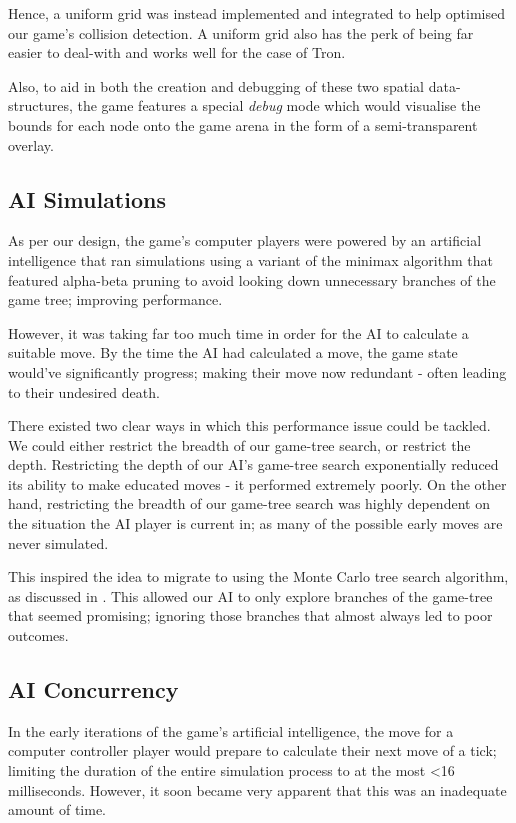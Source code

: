 \documentclass{standalone}
\begin{document}
			Hence, a uniform grid was instead implemented and integrated to help optimised our game's collision detection. A uniform grid also has the perk of being far easier to deal-with and works well for the case of Tron.

			Also, to aid in both the creation and debugging of these two spatial data-structures, the game features a special \emph{debug} mode which would visualise the bounds for each node onto the game arena in the form of a semi-transparent overlay.

		\subsection{AI Simulations} \label{sec:aiSimulations}
			As per our design, the game's computer players were powered by an artificial intelligence that ran simulations using a variant of the minimax algorithm \parencite{minimax} that featured alpha-beta pruning \parencite{alphaBeta} to avoid looking down unnecessary branches of the game tree; improving performance.

			However, it was taking far too much time in order for the AI to calculate a suitable move. By the time the AI had calculated a move, the game state would've significantly progress; making their move now redundant - often leading to their undesired death.

			There existed two clear ways in which this performance issue could be tackled. We could either restrict the breadth of our game-tree search, or restrict the depth. Restricting the depth of our AI's game-tree search exponentially reduced its ability to make educated moves - it performed extremely poorly. On the other hand, restricting the breadth of our game-tree search was highly dependent on the situation the AI player is current in; as many of the possible early moves are never simulated.

			This inspired the idea to migrate to using the Monte Carlo tree search algorithm, as discussed in . This allowed our AI to only explore branches of the game-tree that seemed promising; ignoring those branches that almost always led to poor outcomes.

		\subsection{AI Concurrency} \label{sec:aiConcurrency}
			In the early iterations of the game's artificial intelligence, the move for a computer controller player would prepare to calculate their next move of a tick; limiting the duration of the entire simulation process to at the most \textless 16 milliseconds. However, it soon became very apparent that this was an inadequate amount of time.
\end{document}
